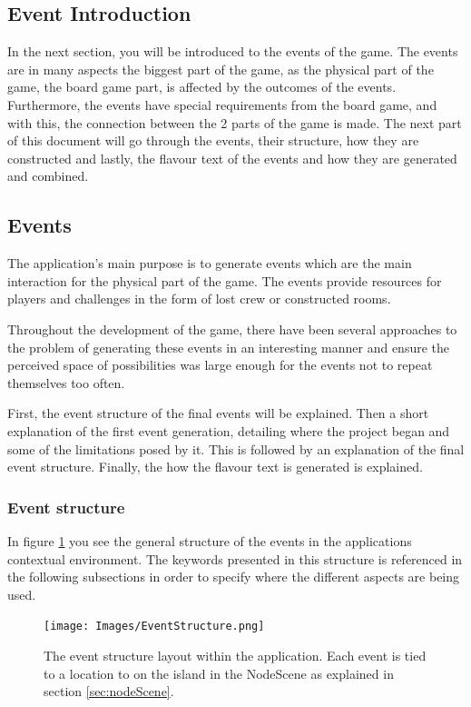 \subsection{Event Introduction}
In the next section, you will be introduced to the events of the game. The events are in many aspects the biggest part of the game, as the physical part of the game, the board game part, is affected by the outcomes of the events. Furthermore, the events have special requirements from the board game, and with this, the connection between the 2 parts of the game is made.
The next part of this document will go through the events, their structure, how they are constructed and lastly, the flavour text of the events and how they are generated and combined.

\subsection{Events}
\label{sec:eve}
The application's main purpose is to generate events which are the main interaction for the physical part of the game. The events provide resources for players and challenges in the form of lost crew or constructed rooms.

Throughout the development of the game, there have been several approaches to the problem of generating these events in an interesting manner and ensure the perceived space of possibilities was large enough for the events not to repeat themselves too often.

First, the event structure of the final events will be explained. Then a short explanation of the first event generation, detailing where the project began and some of the limitations posed by it. This is followed by an explanation of the final event structure. Finally, the how the flavour text is generated is explained.

\subsubsection{Event structure}
In figure \ref{fig:eStruc} you see the general structure of the events in the applications contextual environment. The keywords presented in this structure is referenced in the following subsections in order to specify where the different aspects are being used.

\begin{figure}[!ht]
    \centering
    \texttt{[image: Images/EventStructure.png]}
    \caption{The event structure layout within the application. Each event is tied to a location to on the island in the NodeScene as explained in section \ref{sec:nodeScene}.}
    \label{fig:eStruc}
\end{figure}

